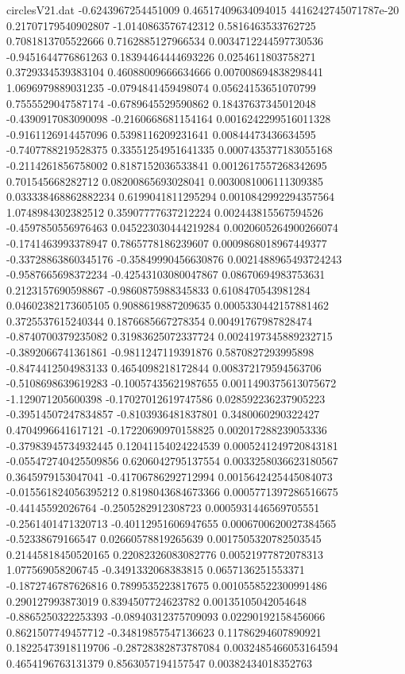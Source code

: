 \begin{filecontents}{circlesV21.dat}
-0.6243967254451009	0.46517409634094015	4416242745071787e-20
0.21707179540902807	-1.0140863576742312	0.5816463533762725
0.7081813705522666	0.7162885127966534	0.0034712244597730536
-0.9451644776861263	0.18394464444693226	0.0254611803758271
0.3729334539383104	0.46088009666634666	0.007008694838298441
1.0696979889031235	-0.0794841459498074	0.05624153651070799
0.7555529047587174	-0.6789645529590862	0.18437637345012048
-0.4390917083090098	-0.2160668681154164	0.0016242299516011328
-0.9161126914457096	0.5398116209231641	0.00844473436634595
-0.7407788219528375	0.33551254951641335	0.0007435377183055168
-0.2114261856758002	0.8187152036533841	0.0012617557268342695
0.701545668282712	0.08200865693028041	0.0030081006111309385
0.033338468862882234	0.6199041811295294	0.0010842992294357564
1.0748984302382512	0.35907777637212224	0.002443815567594526
-0.4597850556976463	0.045223030444219284	0.0020605264900266074
-0.1741463993378947	0.7865778186239607	0.0009868018967449377
-0.33728863860345176	-0.35849990456630876	0.0021488965493724243
-0.9587665698372234	-0.42543103080047867	0.08670694983753631
0.2123157690598867	-0.9860875988345833	0.6108470543981284
0.04602382173605105	0.9088619887209635	0.0005330442157881462
0.3725537615240344	0.1876685667278354	0.00491767987828474
-0.8740700379235082	0.31983625072337724	0.0024197345889232715
-0.3892066741361861	-0.9811247119391876	0.5870827293995898
-0.8474412504983133	0.4654098218172844	0.008372179594563706
-0.5108698639619283	-0.10057435621987655	0.0011490375613075672
-1.129071205600398	-0.17027012619747586	0.028592236237905223
-0.39514507247834857	-0.8103936481837801	0.3480060290322427
0.4704996641617121	-0.17220690970158825	0.002017288239053336
-0.37983945734932445	0.12041154024224539	0.0005241249720843181
-0.055472740425509856	0.6206042795137554	0.0033258036623180567
0.3645979153047041	-0.41706786292712994	0.0015642425445084073
-0.015561824056395212	0.8198043684673366	0.0005771397286516675
-0.44145592026764	-0.2505282912308723	0.0005931446569705551
-0.2561401471320713	-0.40112951606947655	0.0006700620027384565
-0.52338679166547	0.02660578819265639	0.0017505320782503545
0.21445818450520165	0.22082326083082776	0.00521977872078313
1.077569058206745	-0.3491332068383815	0.0657136251553371
-0.1872746787626816	0.7899535223817675	0.0010558522300991486
0.290127993873019	0.8394507724623782	0.00135105042054648
-0.8865250322253393	-0.08940312375709093	0.02290192158456066
0.8621507749457712	-0.34819857547136623	0.11786294607890921
0.18225473918119706	-0.28728382873787084	0.0032485466053164594
0.4654196763131379	0.8563057194157547	0.00382434018352763

\end{filecontents}
